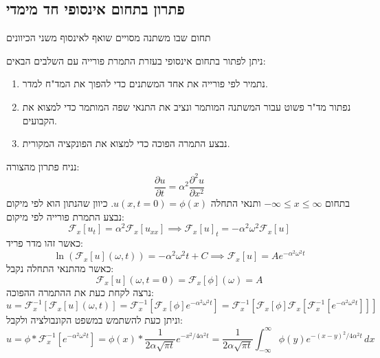 \documentclass{tstextbook}
\begin{document}
\subsection{פתרון בתחום אינסופי חד מימדי}

\begin{definition}
תחום שבו משתנה מסויים שואף לאינסוף משני הכיוונים

\end{definition}
\begin{proposition}
ניתן לפתור בתחום אינסופי בעזרת התמרת פורייה עם השלבים הבאים:

  \begin{enumerate}
    \item נתמיר לפי פורייה את אחד המשתנים כדי להפוך את המד"ח למדר. 


    \item נפתור מד"ר פשוט עבור המשתנה המותמר ונציב את התנאי שפה המותמר כדי למצוא את הקבועים. 


    \item נבצע התמרה הפוכה כדי למצוא את הפונקציה המקורית. 


  \end{enumerate}
\end{proposition}
\begin{example}
נניח פתרון מהצורה:
$$\frac{\partial u}{\partial t} =\alpha^{2}\frac{\partial^{2}u}{\partial x^{2}} $$
בתחום \(-\infty \leq x\leq \infty\) ותנאי התחלה \(u(x,t=0)=\phi(x)\). כיוון שהנתון הוא לפי מיקום נבצע התמרת פורייה לפי מיקום:
$$\mathcal{F} _{x}[u_{t}]=\alpha^{2}\mathcal{F} _{x}[u_{x x}]\implies \mathcal{F} _{x}[u]_{t}=-\alpha^{2}\omega^{2}\mathcal{F} _{x}[u]$$
כאשר זהו מדר פריד:
$$\ln\left( \mathcal{F} _{x}[u]\left( \omega,t \right) \right)=-\alpha^{2}\omega^{2}t+C\implies \mathcal{F} _{x}[u]=Ae^{ -\alpha^{2}\omega^{2}t }$$
כאשר מהתנאי התחלה נקבל:
$$\mathcal{F} _{x}[u]\left( \omega,t =0\right)=\mathcal{F} _{x}\left[ \phi \right]\left( \omega \right)=A$$
נרצה לקחת כעת את ההתמרה ההפוכה:
$$u=\mathcal{F} _{x}^{-1}\left[ \mathcal{F} _{x}[u]\left( \omega,t \right) \right]=\mathcal{F}^{-1} _{x}\left[ \mathcal{F} _{x}\left[ \phi \right]e^{ -\alpha^{2}\omega^{2}t } \right]=\mathcal{F} _{x}^{-1}\left[ \mathcal{F} _{x}\left[ \phi \right]\mathcal{F} _{x}\left[ \mathcal{F} _{x}^{-1}\left[ e^{ -\alpha^{2}\omega^{2}t } \right] \right] \right]$$
וניתן כעת להשתמש במשפט הקונבולציה ולקבל:
$$u=\phi * \mathcal{F} _{x}^{-1}\left[ e^{ -\alpha^{2}\omega^{2}t } \right]=\phi(x)* \frac{1}{2\alpha \sqrt{ \pi t}}e^{ -x^{2}/4\alpha^{2}t }= \frac{1}{2\alpha \sqrt{ \pi t }}\int_{-\infty}^{\infty} \phi(y)e^{ -(x-y)^{2}/4\alpha^{2}t } \, dx $$

\end{example}
\end{document}
